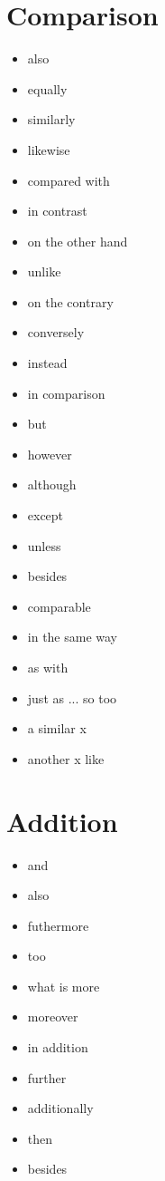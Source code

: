 \documentclass[twocolumn, a4paper]{article}
\begin{document}
\section{Comparison}
{\color{orange}
	\begin{itemize}[leftmargin=*, noitemsep]
		\item also
		\item equally
		\item similarly
		\item likewise
		\item compared with
		\item in contrast
		\item on the other hand
		\item unlike
		\item on the contrary
		\item conversely
		\item instead
		\item in comparison
		\item but
		\item however
		\item although
		\item except
		\item unless
		\item besides
		\item comparable
		\item in the same way
		\item as with
		\item just as ... so too
		\item a similar x
		\item another x like
	\end{itemize}
}

\section{Addition}
{\color{myGreen}
	\begin{itemize}[leftmargin=*, noitemsep]
		\item and
		\item also
		\item futhermore
		\item too
		\item what is more
		\item moreover
		\item in addition
		\item further
		\item additionally
		\item then
		\item besides
	\end{itemize}
}
\end{document}
